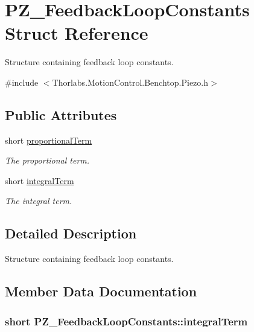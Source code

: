 \hypertarget{struct_p_z___feedback_loop_constants}{}\section{P\+Z\+\_\+\+Feedback\+Loop\+Constants Struct Reference}
\label{struct_p_z___feedback_loop_constants}


Structure containing feedback loop constants.  




{\ttfamily \#include $<$Thorlabs.\+Motion\+Control.\+Benchtop.\+Piezo.\+h$>$}

\subsection*{Public Attributes}
\begin{DoxyCompactItemize}
\item 
short \hyperlink{struct_p_z___feedback_loop_constants_aa6a8de8a1dbbf95a1f47aa6332bf863c}{proportional\+Term}
\begin{DoxyCompactList}\small\item\em The proportional term. \end{DoxyCompactList}\item 
short \hyperlink{struct_p_z___feedback_loop_constants_a1363dbd28bac79dee84892ba63d9d841}{integral\+Term}
\begin{DoxyCompactList}\small\item\em The integral term. \end{DoxyCompactList}\end{DoxyCompactItemize}


\subsection{Detailed Description}
Structure containing feedback loop constants. 



\subsection{Member Data Documentation}
\subsubsection[{\texorpdfstring{integral\+Term}{integralTerm}}]{\setlength{\rightskip}{0pt plus 5cm}short P\+Z\+\_\+\+Feedback\+Loop\+Constants\+::integral\+Term}\hypertarget{struct_p_z___feedback_loop_constants_a1363dbd28bac79dee84892ba63d9d841}{}\label{struct_p_z___feedback_loop_constants_a1363dbd28bac79dee84892ba63d9d841}


